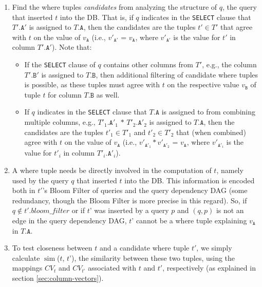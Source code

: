 \begin{enumerate}
    \item Find the where tuples \textit{candidates} from analyzing the structure of $q$, the query that inserted $t$ into the DB. That is, if $q$ indicates in the \texttt{SELECT} clause that $T'.\texttt{A}'$ is assigned to $T.\texttt{A}$, then the candidates are the tuples $t' \in T'$ that agree with $t$ on the value of $v_\texttt{A}$ (i.e., $v'_{\texttt{A}'}$ = $v_\texttt{A}$, where $v'_{\texttt{A}'}$ is the value for $t'$ in column $T'.\texttt{A}'$). 
    Note that: 
    \begin{itemize}
        \item If the \texttt{SELECT} clause of $q$ contains other columns from $T'$, e.g., the column $T'.\texttt{B}'$ is assigned to $T.\texttt{B}$, then additional filtering of candidate where tuples is possible, as these tuples must agree with $t$ on the respective value $v_\texttt{B}$ of tuple $t$ for column $T.\texttt{B}$ as well. 
        \item If $q$ indicates in the \texttt{SELECT} clause that $T.\texttt{A}$ is assigned to from combining multiple columns, e.g., $T'_1.\texttt{A}'_1$ $*$ $T'_2.\texttt{A}'_2$ is assigned to $T.\texttt{A}$, then the candidates are the tuples $t'_1 \in T'_1$ and $t'_2 \in T'_2$ that (when combined) agree with $t$ on the value of $v_\texttt{A}$ (i.e., $v'_{\texttt{A}'_1} * v'_{\texttt{A}'_2}$ = $v_\texttt{A}$, where $v'_{\texttt{A}'_i}$ is the value for $t'_i$ in column $T'_i.\texttt{A}'_i$). 
    \end{itemize}
    \item A where tuple needs be directly involved in the computation of $t$, namely used by the query $q$ that inserted $t$ into the DB.
    This information is encoded both in $t'$'s Bloom Filter of queries and the query dependency DAG (some redundancy, though the Bloom Filter is more precise in this regard).
    So, if $q \notin t'.bloom\_filter$ or if $t’$ was inserted by a query $p$ and $(q,p)$ is not an edge in the query dependency DAG, $t’$ cannot be a where tuple explaining $v_\texttt{A}$ in $T.\texttt{A}$.
    \item To test closeness between $t$ and a candidate where tuple $t'$, we simply calculate $\operatorname{sim}$($t$, $t’$), the similarity between these two tuples, using the mappings $CV_t$ and $CV_{t’}$ associated with $t$ and $t'$, respectively (as explained in section \ref{sec:column-vectors}).
\end{enumerate}

